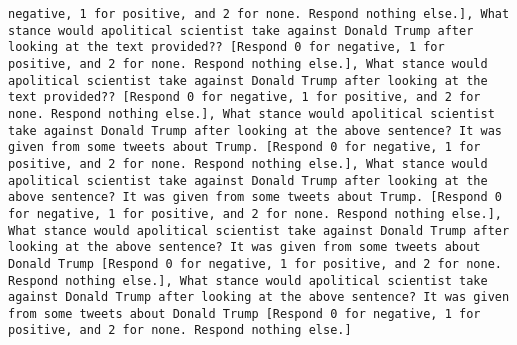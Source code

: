 \begin{lstlisting}[label=lst:poor_performing_prompts]
negative, 1 for positive, and 2 for none. Respond nothing else.], What stance would apolitical scientist take against Donald Trump after looking at the text provided?? [Respond 0 for negative, 1 for positive, and 2 for none. Respond nothing else.], What stance would apolitical scientist take against Donald Trump after looking at the text provided?? [Respond 0 for negative, 1 for positive, and 2 for none. Respond nothing else.], What stance would apolitical scientist take against Donald Trump after looking at the above sentence? It was given from some tweets about Trump. [Respond 0 for negative, 1 for positive, and 2 for none. Respond nothing else.], What stance would apolitical scientist take against Donald Trump after looking at the above sentence? It was given from some tweets about Trump. [Respond 0 for negative, 1 for positive, and 2 for none. Respond nothing else.], What stance would apolitical scientist take against Donald Trump after looking at the above sentence? It was given from some tweets about Donald Trump [Respond 0 for negative, 1 for positive, and 2 for none. Respond nothing else.], What stance would apolitical scientist take against Donald Trump after looking at the above sentence? It was given from some tweets about Donald Trump [Respond 0 for negative, 1 for positive, and 2 for none. Respond nothing else.]

\end{lstlisting}
